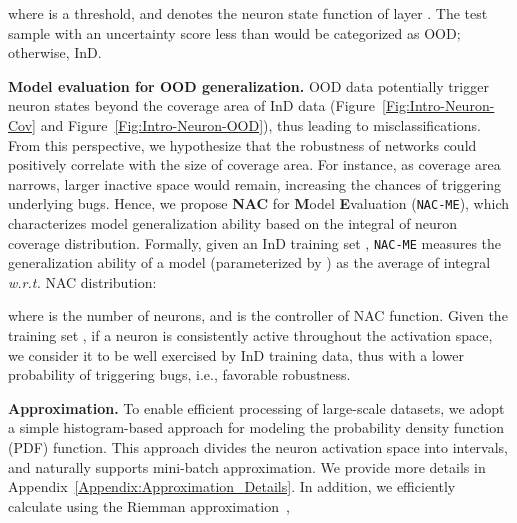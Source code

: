 \documentclass{article} \usepackage{iclr2024_conference,times}
\newcommand{\bfstart}[1]{\noindent\textbf{#1.}}
\begin{document}
where  is a threshold, and  denotes the neuron state function of layer . The test sample with an uncertainty score  less than  would be categorized as OOD; otherwise, InD.



















\bfstart{Model evaluation for OOD generalization} 
OOD data potentially trigger neuron states beyond the coverage area of InD data (Figure~\ref{Fig:Intro-Neuron-Cov} and Figure~\ref{Fig:Intro-Neuron-OOD}), thus leading to misclassifications. 
From this perspective, we hypothesize that the robustness of networks could positively correlate with the size of coverage area.
For instance, as coverage area narrows, larger inactive space would remain, increasing the chances of triggering underlying bugs.
Hence, we propose \textbf{NAC} for \textbf{M}odel \textbf{E}valuation (\texttt{NAC-ME}), which characterizes model generalization ability based on the integral of neuron coverage distribution. 
Formally, given an InD training set , \texttt{NAC-ME} measures the generalization ability of a model (parameterized by ) as the average of integral \textit{w.r.t.} NAC distribution:

where 
 is the number of neurons, and  is the controller of NAC function. 
Given the training set , if a neuron is consistently active throughout the activation space, we consider it to be well exercised by InD training data, thus with a lower probability of triggering bugs, i.e., favorable robustness.













\bfstart{Approximation} 
To enable efficient processing of large-scale datasets, we adopt a simple histogram-based approach for modeling the probability density function (PDF) function.  This approach divides the neuron activation space into  intervals, and naturally supports mini-batch approximation. We provide more details in  Appendix~\ref{Appendix:Approximation_Details}.
In addition, we efficiently calculate  using the Riemman approximation~\citep{Rieman}, 
\vspace{-1mm}
\end{document}
